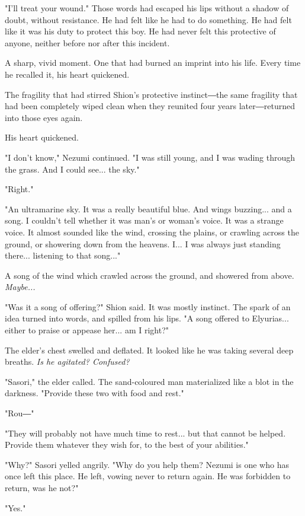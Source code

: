 "I'll treat your wound." Those words had escaped his lips without a
shadow of doubt, without resistance. He had felt like he had to do
something. He had felt like it was his duty to protect this boy. He had
never felt this protective of anyone, neither before nor after this
incident.

A sharp, vivid moment. One that had burned an imprint into his life.
Every time he recalled it, his heart quickened.

The fragility that had stirred Shion's protective instinct―the same
fragility that had been completely wiped clean when they reunited four
years later―returned into those eyes again.

His heart quickened.

"I don't know," Nezumi continued. "I was still young, and I was wading
through the grass. And I could see... the sky."

"Right."

"An ultramarine sky. It was a really beautiful blue. And wings
buzzing... and a song. I couldn't tell whether it was man's or woman's
voice. It was a strange voice. It almost sounded like the wind, crossing
the plains, or crawling across the ground, or showering down from the
heavens. I... I was always just standing there... listening to that
song..."

A song of the wind which crawled across the ground, and showered from
above. \emph{Maybe...}

"Was it a song of offering?" Shion said. It was mostly instinct. The
spark of an idea turned into words, and spilled from his lips. "A song
offered to Elyurias... either to praise or appease her... am I right?"

The elder's chest swelled and deflated. It looked like he was taking
several deep breaths. \emph{Is he agitated? Confused?}

"Sasori," the elder called. The sand-coloured man materialized like a
blot in the darkness. "Provide these two with food and rest."

"Rou―"

"They will probably not have much time to rest... but that cannot be
helped. Provide them whatever they wish for, to the best of your
abilities."

"Why?" Sasori yelled angrily. "Why do you help them? Nezumi is one who
has once left this place. He left, vowing never to return again. He was
forbidden to return, was he not?"

"Yes."

